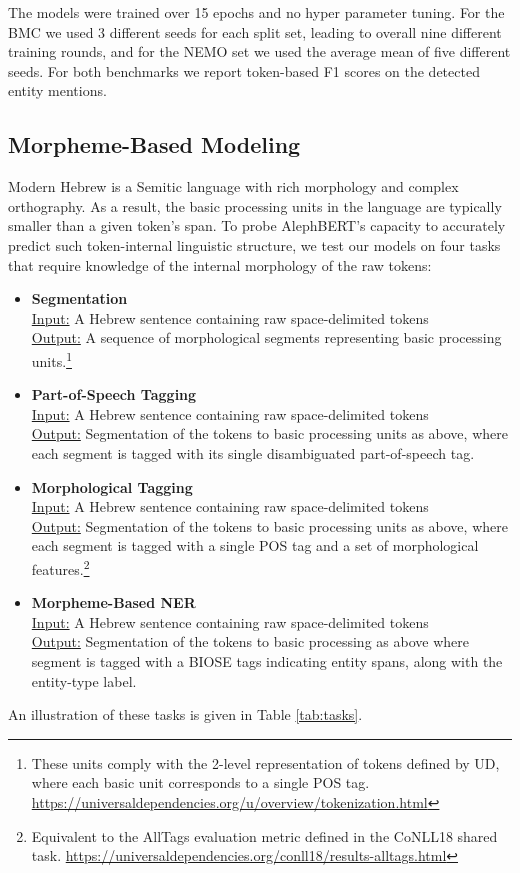 \documentclass[11pt,a4paper]{article}
\begin{document}
The models were trained over 15 epochs and no hyper parameter tuning. For the BMC we used 3 different seeds for each split set, leading  to overall nine different training rounds, and for the NEMO set we used the average mean of five different seeds.  
For both benchmarks we report token-based F1 scores on the detected entity mentions.

\subsection{Morpheme-Based Modeling}
Modern Hebrew is a Semitic language with rich morphology and complex orthography. As a result, the basic processing units in the language are typically smaller than a given token's span. To probe {AlephBERT}'s capacity to accurately predict such token-internal  linguistic structure,  we test our  models on four  tasks that require knowledge of the internal morphology  of the raw tokens:

\begin{itemize}
\item  {\bf Segmentation}\\
\underline{Input:} A Hebrew sentence containing raw space-delimited tokens \\
\underline{Output:} A sequence of morphological segments representing  basic processing units.\footnote{These units comply with the 2-level representation of tokens defined by UD, where each basic unit corresponds to a single POS tag. \url{https://universaldependencies.org/u/overview/tokenization.html}}
\item  {\bf Part-of-Speech Tagging}\\
\underline{Input:} A Hebrew sentence containing raw  space-delimited tokens \\
\underline{Output:} Segmentation of the tokens to basic processing units as above, where each segment is tagged with its single disambiguated part-of-speech tag.
\item   {\bf Morphological Tagging}\\
\underline{Input:} A Hebrew sentence containing raw space-delimited tokens \\
\underline{Output:} Segmentation of the tokens to basic processing units as above, where each segment is tagged with a single POS tag and a set of morphological features.\footnote{Equivalent to the AllTags evaluation metric defined in the CoNLL18 shared task. \url{https://universaldependencies.org/conll18/results-alltags.html}}
\item   {\bf Morpheme-Based NER}\\
\underline{Input:} A Hebrew sentence containing raw space-delimited tokens \\
\underline{Output:} Segmentation of the tokens to basic processing as above where segment is tagged with a BIOSE tags indicating entity spans, along with the entity-type label.
\end{itemize}
An illustration of these tasks is given in Table \ref{tab:tasks}.
\end{document}
